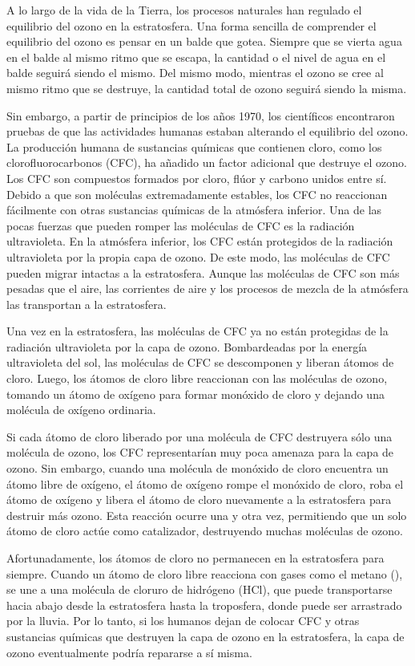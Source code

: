 A lo largo de la vida de la Tierra, los procesos naturales han regulado el equilibrio del ozono en la estratosfera. Una forma sencilla de comprender el equilibrio del ozono es pensar en un balde que gotea. Siempre que se vierta agua en el balde al mismo ritmo que se escapa, la cantidad o el nivel de agua en el balde seguirá siendo el mismo. Del mismo modo, mientras el ozono se cree al mismo ritmo que se destruye, la cantidad total de ozono seguirá siendo la misma.

Sin embargo, a partir de principios de los años 1970, los científicos encontraron pruebas de que las actividades humanas estaban alterando el equilibrio del ozono. La producción humana de sustancias químicas que contienen cloro, como los clorofluorocarbonos (CFC), ha añadido un factor adicional que destruye el ozono. Los CFC son compuestos formados por cloro, flúor y carbono unidos entre sí. Debido a que son moléculas extremadamente estables, los CFC no reaccionan fácilmente con otras sustancias químicas de la atmósfera inferior. Una de las pocas fuerzas que pueden romper las moléculas de CFC es la radiación ultravioleta. En la atmósfera inferior, los CFC están protegidos de la radiación ultravioleta por la propia capa de ozono. De este modo, las moléculas de CFC pueden migrar intactas a la estratosfera. Aunque las moléculas de CFC son más pesadas que el aire, las corrientes de aire y los procesos de mezcla de la atmósfera las transportan a la estratosfera.

Una vez en la estratosfera, las moléculas de CFC ya no están protegidas de la radiación ultravioleta por la capa de ozono. Bombardeadas por la energía ultravioleta del sol, las moléculas de CFC se descomponen y liberan átomos de cloro. Luego, los átomos de cloro libre reaccionan con las moléculas de ozono, tomando un átomo de oxígeno para formar monóxido de cloro y dejando una molécula de oxígeno ordinaria.

Si cada átomo de cloro liberado por una molécula de CFC destruyera sólo una molécula de ozono, los CFC representarían muy poca amenaza para la capa de ozono. Sin embargo, cuando una molécula de monóxido de cloro encuentra un átomo libre de oxígeno, el átomo de oxígeno rompe el monóxido de cloro, roba el átomo de oxígeno y libera el átomo de cloro nuevamente a la estratosfera para destruir más ozono. Esta reacción ocurre una y otra vez, permitiendo que un solo átomo de cloro actúe como catalizador, destruyendo muchas moléculas de ozono.

Afortunadamente, los átomos de cloro no permanecen en la estratosfera para siempre. Cuando un átomo de cloro libre reacciona con gases como el metano (), se une a una molécula de cloruro de hidrógeno (HCl), que puede transportarse hacia abajo desde la estratosfera hasta la troposfera, donde puede ser arrastrado por la lluvia. Por lo tanto, si los humanos dejan de colocar CFC y otras sustancias químicas que destruyen la capa de ozono en la estratosfera, la capa de ozono eventualmente podría repararse a sí misma.

